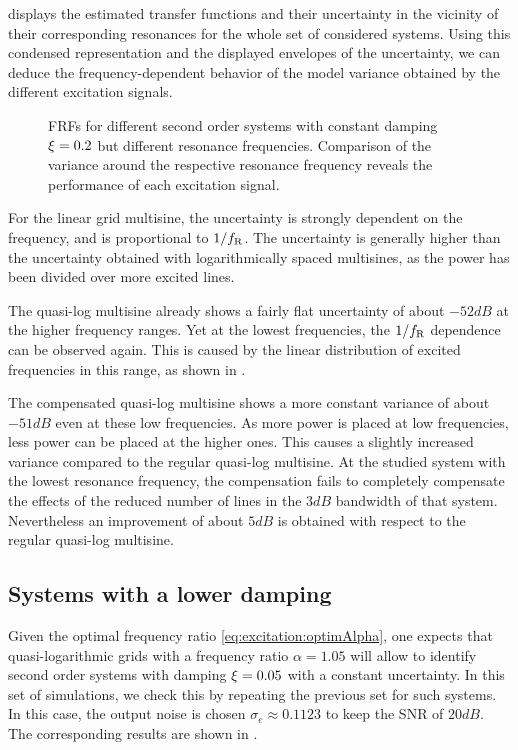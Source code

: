    displays the estimated transfer functions and their uncertainty in the vicinity of their corresponding resonances for the whole set of considered systems.
  Using this condensed representation and the displayed envelopes of the uncertainty, we can deduce the frequency-dependent behavior of the model variance obtained by the different excitation signals.

  \begin{figure}%
    \centering
      \setlength{}
      \setlength\figureheight{0.68\figurewidth}
    
    \caption[Simulated \glspl{FRF} and their variances of systems with $\damping=0.2$ for different excitation signals.]{%
       \Glspl{FRF} for different second order systems with constant damping $\damping=0.2$ but different resonance frequencies. 
       Comparison of the variance around the respective resonance frequency reveals the performance of each excitation signal.}%
    \label{fig:excitation:damping02}
  \end{figure}

  For the linear grid multisine, the uncertainty is strongly dependent on the frequency, and is proportional to $1/f_{\mathrm{R}}$.
  The uncertainty is generally higher than the uncertainty obtained with logarithmically spaced multisines, as the power has been divided over more excited lines.

  The quasi-log multisine already shows a fairly flat uncertainty of about $-52 \unit{dB}$ at the higher frequency ranges.
  Yet at the lowest frequencies, the $1/f_{\mathrm{R}}$ dependence can be observed again.
  This is caused by the linear distribution of excited frequencies in this range, as shown in .

  The compensated quasi-log multisine shows a more constant variance of about $-51 \unit{dB}$ even at these low frequencies.
  As more power is placed at low frequencies, less power can be placed at the higher ones.
  This causes a slightly increased variance compared to the regular quasi-log multisine.
  At the studied system with the lowest resonance frequency, the compensation fails to completely compensate the effects of the reduced number of lines in the $3\unit{dB}$ bandwidth of that system.
  Nevertheless an improvement of about $5\unit{dB}$ is obtained with respect to the regular quasi-log multisine.

  \subsection{Systems with a lower damping}
  Given the optimal frequency ratio \eqref{eq:excitation:optimAlpha}, one expects that quasi-logarithmic grids with a frequency ratio $\alpha = 1.05$ will allow to identify second order systems with damping $\xi_{} = 0.05$ with a constant uncertainty.
  In this set of simulations, we check this by repeating the previous set for such systems.
  In this case, the output noise is chosen $\sigma_e \approx 0.1123$ to keep the \gls{SNR} of $20\unit{dB}$.
  The corresponding results are shown in .
 
